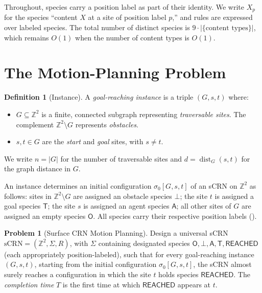 \documentclass[11pt]{article}
\theoremstyle{plain}
\theoremstyle{definition}
\newtheorem{definition}[theorem]{Definition}
\newtheorem{problem}[theorem]{Problem}
\theoremstyle{remark}
\newcommand{\Z}{\mathbb{Z}}
\newcommand{\sCRN}{\text{sCRN}}
\DeclareMathOperator{\dist}{dist}
\begin{document}
Throughout, species carry a position label as part of their identity. We write $X_p$ for the species ``content $X$ at a site of position label $p$,'' and rules are expressed over labeled species. The total number of distinct species is $9 \cdot |\{\text{content types}\}|$, which remains $O(1)$ when the number of content types is $O(1)$.

\section{The Motion-Planning Problem}
\label{sec:problem}

\begin{definition}[Instance]
\label{def:instance}
A \emph{goal-reaching instance} is a triple $(G, s, t)$ where:
\begin{itemize}
    \item $G \subseteq \Z^2$ is a finite, connected subgraph representing \emph{traversable sites}. The complement $\Z^2 \setminus G$ represents \emph{obstacles}.
    \item $s, t \in G$ are the \emph{start} and \emph{goal} sites, with $s \neq t$.
\end{itemize}
We write $n = |G|$ for the number of traversable sites and $d = \dist_G(s, t)$ for the graph distance in $G$.
\end{definition}

An instance determines an initial configuration $\sigma_0[G, s, t]$ of an sCRN on $\Z^2$ as follows: sites in $\Z^2 \setminus G$ are assigned an obstacle species $\bot$; the site $t$ is assigned a goal species $\mathsf{T}$; the site $s$ is assigned an agent species $\mathsf{A}$; all other sites of $G$ are assigned an empty species $\mathsf{O}$. All species carry their respective position labels ().

\begin{problem}[Surface CRN Motion Planning]
\label{prob:motion}
Design a universal sCRN $\sCRN = (\Z^2, \Sigma, R)$, with $\Sigma$ containing designated species $\mathsf{O}, \bot, \mathsf{A}, \mathsf{T}, \mathsf{REACHED}$ (each appropriately position-labeled), such that for every goal-reaching instance $(G, s, t)$, starting from the initial configuration $\sigma_0[G, s, t]$, the sCRN almost surely reaches a configuration in which the site $t$ holds species $\mathsf{REACHED}$. The \emph{completion time} $T$ is the first time at which $\mathsf{REACHED}$ appears at $t$.
\end{problem}
\end{document}

